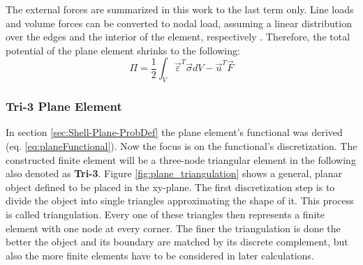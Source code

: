   The external forces are summarized in this work to the last term only. Line loads and volume forces can be converted to nodal load, assuming a linear distribution over the edges and the interior of the element, respectively \cite{steinke2005finite}. Therefore, the total potential of the plane element shrinks to the following:
  \begin{equation}\label{eq:planeFunctional}
  \Pi = \frac{1}{2} \int_{V}\vec{\varepsilon}^T\vec{\sigma}dV - \vec{u}^T \vec{F}
  \end{equation}
  
  
  
  
  
  
  
  
  \subsubsection{Tri-3 Plane Element}\label{sec:Shell-Plane-Tri}
  In section \ref{sec:Shell-Plane-ProbDef} the plane element's functional was derived (eq. \eqref{eq:planeFunctional}). Now the focus is on the functional's discretization. The constructed finite element will be a three-node triangular element in the following also denoted as \textbf{Tri-3}. Figure \ref{fig:plane_triangulation} shows a general, planar object defined to be placed in the xy-plane. The first discretization step is to divide the object into single triangles approximating the shape of it. This process is called triangulation. Every one of these triangles then represents a finite element with one node at every corner. The finer the triangulation is done the better the object and its boundary are matched by its discrete complement, but also the more finite elements have to be considered in later calculations.
